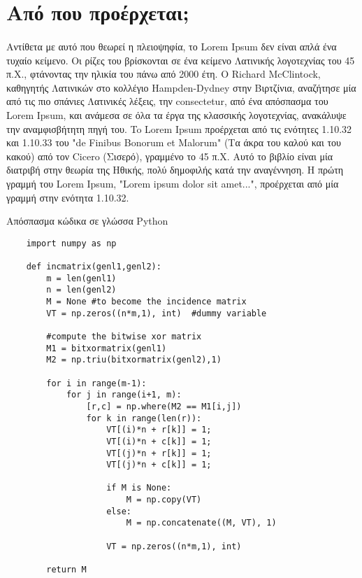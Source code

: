 \section{Από που προέρχεται;}
    \paragraph{}
    Αντίθετα με αυτό που θεωρεί η πλειοψηφία, το Lorem Ipsum δεν είναι απλά ένα τυχαίο κείμενο. Οι ρίζες του
    βρίσκονται σε ένα κείμενο Λατινικής λογοτεχνίας του 45 π.Χ., φτάνοντας την ηλικία του πάνω από 2000 έτη.
    Ο Richard McClintock, καθηγητής Λατινικών στο κολλέγιο Hampden-Dydney στην Βιρτζίνια, αναζήτησε μία από
    τις πιο σπάνιες Λατινικές λέξεις, την consectetur, από ένα απόσπασμα του Lorem Ipsum, και ανάμεσα σε όλα
    τα έργα της κλασσικής λογοτεχνίας, ανακάλυψε την αναμφισβήτητη πηγή του. To Lorem Ipsum προέρχεται από
    τις ενότητες 1.10.32 και 1.10.33 του "de Finibus Bonorum et Malorum" (Τα άκρα του καλού και του κακού) από
    τον Cicero (Σισερό), γραμμένο το 45 π.Χ. Αυτό το βιβλίο είναι μία διατριβή στην θεωρία της Ηθικής, πολύ
    δημοφιλής κατά την αναγέννηση. Η πρώτη γραμμή του Lorem Ipsum, "Lorem ipsum dolor sit amet...", προέρχεται
    από μία γραμμή στην ενότητα 1.10.32.

    \begin{listing}[ht]
    \caption{Απόσπασμα κώδικα σε γλώσσα Python}
    \label{listing:python example}

    \begin{verbatim}
    import numpy as np
        
    def incmatrix(genl1,genl2):
        m = len(genl1)
        n = len(genl2)
        M = None #to become the incidence matrix
        VT = np.zeros((n*m,1), int)  #dummy variable
        
        #compute the bitwise xor matrix
        M1 = bitxormatrix(genl1)
        M2 = np.triu(bitxormatrix(genl2),1) 
        
        for i in range(m-1):
            for j in range(i+1, m):
                [r,c] = np.where(M2 == M1[i,j])
                for k in range(len(r)):
                    VT[(i)*n + r[k]] = 1;
                    VT[(i)*n + c[k]] = 1;
                    VT[(j)*n + r[k]] = 1;
                    VT[(j)*n + c[k]] = 1;
        
                    if M is None:
                        M = np.copy(VT)
                    else:
                        M = np.concatenate((M, VT), 1)
        
                    VT = np.zeros((n*m,1), int)
        
        return M
    \end{verbatim}
    \end{listing}

\newpage
